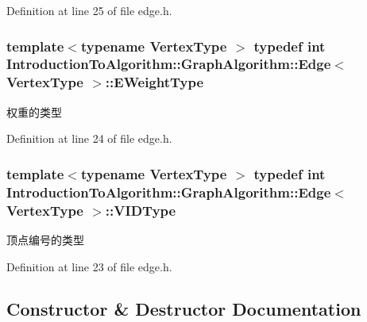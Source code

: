 Definition at line 25 of file edge.\+h.

\hypertarget{struct_introduction_to_algorithm_1_1_graph_algorithm_1_1_edge_aa85e33d0381e5e71188dfafc58dcccc7}{}
\subsubsection[{E\+Weight\+Type}]{\setlength{\rightskip}{0pt plus 5cm}template$<$typename Vertex\+Type $>$ typedef int {\bf Introduction\+To\+Algorithm\+::\+Graph\+Algorithm\+::\+Edge}$<$ Vertex\+Type $>$\+::{\bf E\+Weight\+Type}}\label{struct_introduction_to_algorithm_1_1_graph_algorithm_1_1_edge_aa85e33d0381e5e71188dfafc58dcccc7}
权重的类型 

Definition at line 24 of file edge.\+h.

\hypertarget{struct_introduction_to_algorithm_1_1_graph_algorithm_1_1_edge_af4bfb54d5d23ecd5aa428f62b5553e93}{}
\subsubsection[{V\+I\+D\+Type}]{\setlength{\rightskip}{0pt plus 5cm}template$<$typename Vertex\+Type $>$ typedef int {\bf Introduction\+To\+Algorithm\+::\+Graph\+Algorithm\+::\+Edge}$<$ Vertex\+Type $>$\+::{\bf V\+I\+D\+Type}}\label{struct_introduction_to_algorithm_1_1_graph_algorithm_1_1_edge_af4bfb54d5d23ecd5aa428f62b5553e93}
顶点编号的类型 

Definition at line 23 of file edge.\+h.



\subsection{Constructor \& Destructor Documentation}
\hypertarget{struct_introduction_to_algorithm_1_1_graph_algorithm_1_1_edge_a2f79ea7db1ff7aa3b9308d03fcabe397}{}
